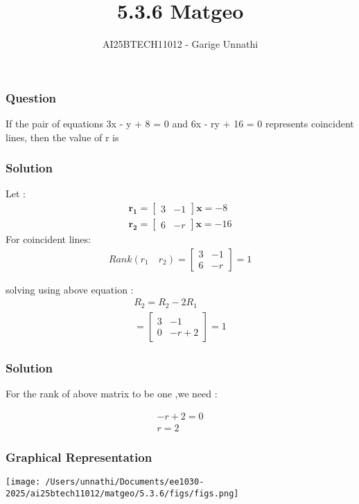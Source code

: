 \documentclass{beamer}
\title{5.3.6 Matgeo}
\author{AI25BTECH11012 - Garige Unnathi}
\date{}
\begin{document}
\frame{\titlepage}

\begin{frame}
\frametitle{Question}
If the pair of equations 3x - y + 8 = 0 and 6x - ry + 16 = 0 represents coincident
lines, then the value of r is 
\end{frame}


\begin{frame}
\frametitle{Solution}
Let :
\begin{align}
\mathbf{r_1} = \begin{bmatrix}3 & -1\end{bmatrix}\mathbf{x} = -8 \\
\mathbf{r_2} = \begin{bmatrix}6 & -r\end{bmatrix}\mathbf{x} = -16
\end{align}
For coincident lines:
\begin{align}
   Rank( \textbf{$r_1$} \quad \textbf{$r_2$})  = \begin{bmatrix}3 & -1\\
                                              6 & -r\end{bmatrix} = 1
\end{align}

solving using above equation :
\begin{align}
   R_2 = R_2 - 2R_1\\
   =  \begin{bmatrix}3 & -1\\
                      0 & -r + 2\end{bmatrix} = 1
\end{align}
\end{frame}



\begin{frame}
\frametitle{Solution}
For the rank of above matrix to be one ,we need :

\begin{align}
   -r + 2 =0 \\
   r = 2 
\end{align}
\end{frame}


\begin{frame}
\frametitle{Graphical Representation}

\begin{center}
\texttt{[image: /Users/unnathi/Documents/ee1030-2025/ai25btech11012/matgeo/5.3.6/figs/figs.png]}
\end{center}
\end{frame}
\end{document}
